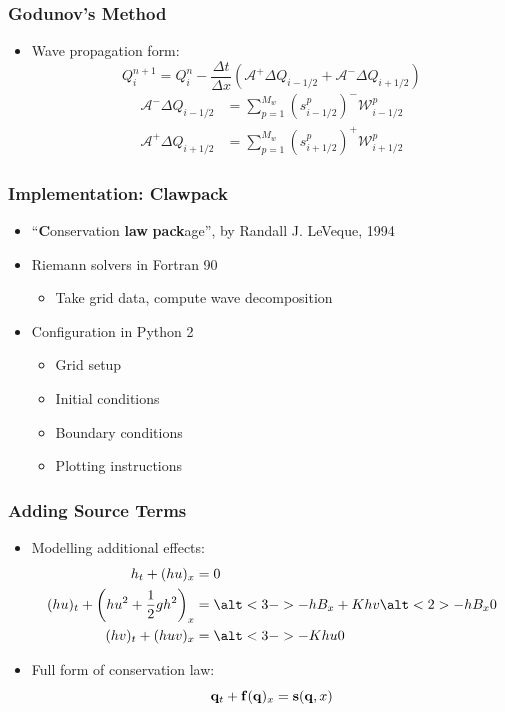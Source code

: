 \documentclass{beamer}
\begin{document}
\begin{frame}
  \frametitle{Godunov's Method}
  \begin{itemize}
    \item Wave propagation form:
      \begin{equation}
        Q_i^{n+1} = Q_i^n - \frac{\Delta t}{\Delta x} (\mathcal{A}^+ \Delta Q_{i-1/2} + \mathcal{A}^- \Delta Q_{i+1/2})
      \end{equation}
      \pause
      \begin{align}
        \mathcal{A}^- \Delta Q_{i-1/2} &= \sum_{p=1}^{M_w} (s_{i-1/2}^p)^-\mathcal{W}_{i-1/2}^p \\
        \mathcal{A}^+ \Delta Q_{i+1/2} &= \sum_{p=1}^{M_w} (s_{i+1/2}^p)^+\mathcal{W}_{i+1/2}^p
      \end{align}
  \end{itemize}
\end{frame}

\begin{frame}
  \frametitle{Implementation: Clawpack}
  \begin{itemize}
    \item ``\textbf{C}onservation \textbf{law} \textbf{pack}age'', by Randall J. LeVeque, 1994
    \pause
    \item Riemann solvers in Fortran 90
    \begin{itemize}
      \item Take grid data, compute wave decomposition
    \end{itemize}
    \pause
    \item Configuration in Python 2
    \begin{itemize}
      \item Grid setup
      \item Initial conditions
      \item Boundary conditions
      \item Plotting instructions
    \end{itemize}
  \end{itemize}
\end{frame}

\begin{frame}
  \frametitle{Adding Source Terms}
  \begin{itemize}
  \item Modelling additional effects:
  \begin{align}
                           h_t + (hu)_x & = 0 \hspace{0.25\textwidth}\\
    (hu)_t + \qty(hu^2 + \frac{1}{2}gh^2)_x & = \alt<3->{-hB_x+Khv}{\alt<2>{-hB_x}{0}} \\
                       (hv)_t + (huv)_x & = \alt<3->{-Khu}{0}
  \end{align}
    \item<4-> Full form of conservation law:
    \begin{equation}
      \vb q_t + \vb f(\vb q)_x = \vb s(\vb q, x)
    \end{equation}
  \end{itemize}
\end{frame}
\end{document}
